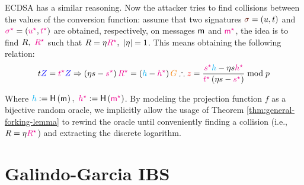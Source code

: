 \documentclass[version=submission, floatrow]{iacrcc}
\begin{document}
ECDSA has a similar reasoning. Now the attacker tries to find collisions between the values of the conversion function: assume that two signatures $\Signature{} = \left(u, t\right)$ and $ \textcolor{magenta}{\sigma^{\star}} = \left(\textcolor{magenta}{u^{\star}}, \textcolor{magenta}{t^{\star}}\right)$ are obtained, respectively, on messages $\mathsf{m}_{}$ and $\textcolor{magenta}{\mathsf{m}_{}^{\star}}$, the idea is to find $R,\ \textcolor{magenta}{R^{\star}}$ such that $R = \eta \textcolor{magenta}{R^{\star}},\ |\eta| = 1$. This means obtaining the following relation:
\begin{equation}\label{eq:ecdsa-extraction}
    t\PubKey{Z} = \Forge{t}\PubKey{Z} \Rightarrow \left(\eta s - \Forge{s}\right)\Forge{R} = \left(\Digest{h} - \Forge{h}\right)\GeneratorEC \therefore  \PrivKey{z} = \dfrac{\Forge{s}\Digest{h} - \eta s\Forge{h}}{\Forge{t}\left(\eta s - \Forge{s}\right)}\bmod{p}
\end{equation}

Where $\Digest{h} := \HashH{\msg{}},\ \Forge{h} := \HashH{\Forge{\msg{}}}$. By modeling the projection function $f$ as a bijective random oracle, we implicitly allow the usage of Theorem \ref{thm:general-forking-lemma} to rewind the oracle until conveniently finding a collision (i.e., $R=\eta\textcolor{magenta}{R^{\star}}$) and extracting the discrete logarithm.



\section{Galindo-Garcia IBS}\label{sec: galindo and garcia}
\end{document}
